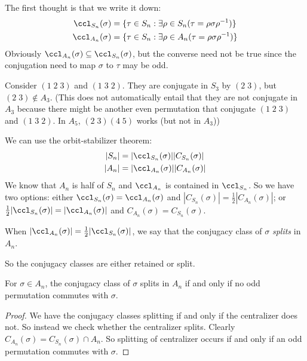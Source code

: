 \documentclass[a4paper]{article}
\begin{document}
The first thought is that we write it down:
\begin{align*}
  \ccl_{S_n}(\sigma) &= \{\tau\in S_n: \exists \rho \in S_n(\tau = \rho\sigma\rho^{-1})\}\\
  \ccl_{A_n}(\sigma) &= \{\tau\in S_n: \exists \rho \in A_n(\tau = \rho\sigma\rho^{-1})\}
\end{align*}
Obviously $\ccl_{A_n}(\sigma)\subseteq \ccl_{S_n}(\sigma)$, but the converse need not be true since the conjugation need to map $\sigma$ to $\tau$ may be odd.

\begin{eg}
  Consider $(1\; 2\; 3)$ and $(1\; 3\; 2)$. They are conjugate in $S_3$ by $(2\; 3)$, but $(2\; 3)\not\in A_3$. (This does not automatically entail that they are not conjugate in $A_3$ because there might be another even permutation that conjugate $(1\; 2\; 3)$ and $(1\; 3\; 2)$. In $A_5$, $(2\; 3)(4\; 5)$ works (but not in $A_3$))
\end{eg}

We can use the orbit-stabilizer theorem:
\begin{align*}
  |S_n| &= |\ccl_{S_n}(\sigma)||C_{S_n}(\sigma)|\\
  |A_n| &= |\ccl_{A_n}(\sigma)||C_{A_n}(\sigma)|
\end{align*}
We know that $A_n$ is half of $S_n$ and $\ccl_{A_n}$ is contained in $\ccl_{S_n}$. So we have two options: either $\ccl_{S_n}(\sigma) = \ccl_{A_n}(\sigma)$ and $|C_{S_n}(\sigma)| = \frac{1}{2}|C_{A_n}(\sigma)|$; or $\frac{1}{2}|\ccl_{S_n}(\sigma)| = |\ccl_{A_n}(\sigma)|$ and $C_{A_n}(\sigma) = C_{S_n}(\sigma)$.

\begin{defi}
  When $|\ccl_{A_n}(\sigma)| = \frac{1}{2}|\ccl_{S_n}(\sigma)|$, we say that the conjugacy class of $\sigma$ \emph{splits} in $A_n$.
\end{defi}

So the conjugacy classes are either retained or split.

\begin{prop}
  For $\sigma\in A_n$, the conjugacy class of $\sigma$ splits in $A_n$ if and only if no odd permutation commutes with $\sigma$.
\end{prop}

\begin{proof}
  We have the conjugacy classes splitting if and only if the centralizer does not. So instead we check whether the centralizer splits. Clearly $C_{A_n}(\sigma) = C_{S_n}(\sigma)\cap A_n$. So splitting of centralizer occurs if and only if an odd permutation commutes with $\sigma$.
\end{proof}
\end{document}
